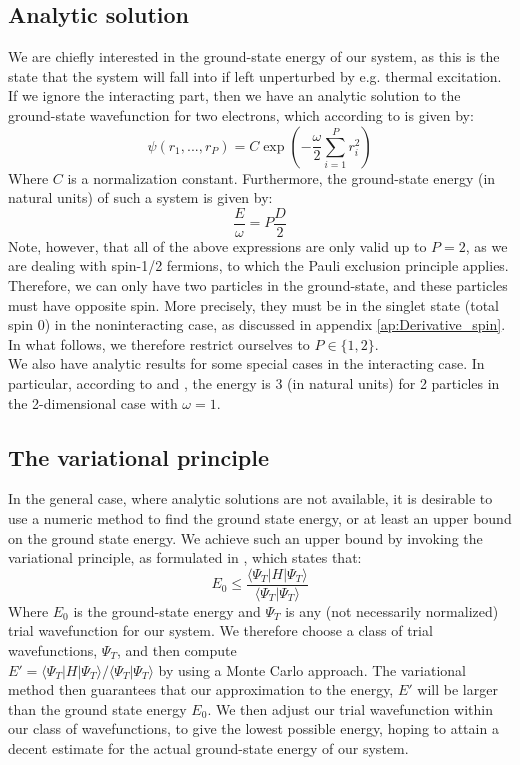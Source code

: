 \documentclass[a4paper, 10pt]{article}
\begin{document}
	\subsection{Analytic solution}
	We are chiefly interested in the ground-state energy of our system, as this is the state that the system will fall into if left unperturbed by e.g. thermal excitation. If we ignore the interacting part, then we have an analytic solution to the ground-state wavefunction for two electrons, which according to \cite{Griffiths2004} is given by:
	\begin{equation}
	\psi(r_1,...,r_P)=C\exp\left(-\frac{\omega}{2}\sum_{i=1}^P r_i^2\right)
	\end{equation}
	Where $C$ is a normalization constant. Furthermore, the ground-state energy (in natural units) of such a system is given by:
	\begin{equation}\label{eq:Ground-state-energy}
	\frac{E}{\omega}=P\frac{D}{2}
	\end{equation}
	Note, however, that all of the above expressions are only valid up to $P=2$, as we are dealing with spin-1/2 fermions, to which the Pauli exclusion principle applies. Therefore, we can only have two particles in the ground-state, and these particles must have opposite spin. More precisely, they must be in the singlet state (total spin $0$) in the noninteracting case, as discussed in appendix \ref{ap:Derivative_spin}. In what follows, we therefore restrict ourselves to $P\in \{1,2\}$.\\
	\linebreak
	We also have analytic results for some special cases in the interacting case. In particular, according to \cite{0305-4470-27-3-040} and \cite{PhysRevB.84.115302}, the energy is $3$ (in natural units) for 2 particles in the 2-dimensional case with $\omega=1$.
	\subsection{The variational principle}
	 In the general case, where analytic solutions are not available, it is desirable to use a numeric method to find the ground state energy, or at least an upper bound on the ground state energy. We achieve such an upper bound by invoking the variational principle, as formulated in \cite{Griffiths2004}, which states that:
	\begin{equation}\label{eq:Variational_Principle}
	E_0\leq \frac{\langle \Psi_T | H |\Psi_T \rangle}{\langle \Psi_T | \Psi_T \rangle}
	\end{equation} 
	Where $E_0$ is the ground-state energy and $\Psi_T$ is any (not necessarily normalized) trial wavefunction for our system. We therefore choose a class of trial wavefunctions, $\Psi_T$, and then compute\\ $E'=\langle \Psi_T | H |\Psi_T\rangle/\langle \Psi_T|\Psi_T \rangle$ by using a Monte Carlo approach. The variational method then guarantees that our approximation to the energy, $E'$ will be larger than the ground state energy $E_0$. We then adjust our trial wavefunction within our class of wavefunctions, to give the lowest possible energy, hoping to attain a decent estimate for the actual ground-state energy of our system. 
\end{document}

